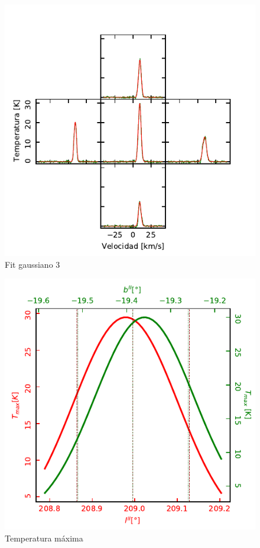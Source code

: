 \begin{figure}[htbp]
	\centering
	\includegraphics{specfit3.pdf}
	\caption{Fit gaussiano 3}
	\label{fig:specfit3}
\end{figure}

\begin{figure}[htbp]
	\centering
	\includegraphics{tmax.pdf}
	\caption{Temperatura máxima}
	\label{fig:tmax}
\end{figure}